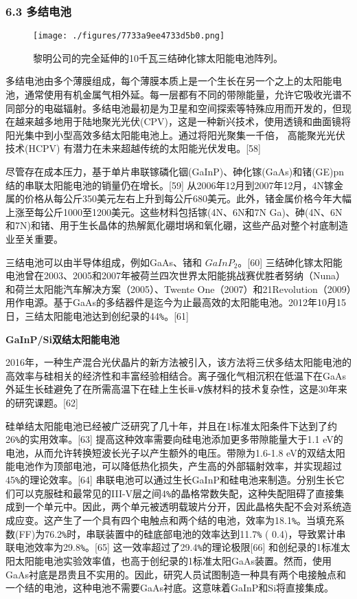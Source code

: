 \subsubsection{6.3 多结电池}

\begin{figure}[ht]
\centering
\texttt{[image: ./figures/7733a9ee4733d5b0.png]}
\caption{黎明公司的完全延伸的10千瓦三结砷化镓太阳能电池阵列。} \label{fig_TYNDC_6}
\end{figure}

多结电池由多个薄膜组成，每个薄膜本质上是一个生长在另一个之上的太阳能电池，通常使用有机金属气相外延。每一层都有不同的带隙能量，允许它吸收光谱不同部分的电磁辐射。多结电池最初是为卫星和空间探索等特殊应用而开发的，但现在越来越多地用于陆地聚光光伏(CPV)，这是一种新兴技术，使用透镜和曲面镜将阳光集中到小型高效多结太阳能电池上。通过将阳光聚集一千倍， 高能聚光光伏技术(HCPV) 有潜力在未来超越传统的太阳能光伏发电。[58]

尽管存在成本压力，基于单片串联镓磷化铟(GaInP)、砷化镓(GaAs)和锗(GE)pn结的串联太阳能电池的销量仍在增长。[59] 从2006年12月到2007年12月，4N镓金属的价格从每公斤350美元左右上升到每公斤680美元。此外，锗金属价格今年大幅上涨至每公斤1000至1200美元。这些材料包括镓(4N、6N和7N Ga)、砷(4N、6N和7N)和锗、用于生长晶体的热解氮化硼坩埚和氧化硼，这些产品对整个衬底制造业至关重要。

三结电池可以由半导体组成，例如GaAs、锗和 $GaInP_2$。[60] 三结砷化镓太阳能电池曾在2003、2005和2007年被荷兰四次世界太阳能挑战赛优胜者努纳（Nuna）和荷兰太阳能汽车解决方案（2005）、Twente One（2007）和21Revolution（2009）用作电源。基于GaAs的多结器件是迄今为止最高效的太阳能电池。2012年10月15日，三结太阳能电池达到创纪录的44\verb|%|。[61]

\textbf{GaInP/Si双结太阳能电池}

2016年，一种生产混合光伏晶片的新方法被引入，该方法将三伏多结太阳能电池的高效率与硅相关的经济性和丰富经验相结合。离子强化气相沉积在低温下在GaAs外延生长硅避免了在所需高温下在硅上生长ⅲ-ⅴ族材料的技术复杂性，这是30年来的研究课题。[62]

硅单结太阳能电池已经被广泛研究了几十年，并且在1标准太阳条件下达到了约26\verb|%|的实用效率。[63] 提高这种效率需要向硅电池添加更多带隙能量大于1.1 eV的电池，从而允许转换短波长光子以产生额外的电压。带隙为1.6-1.8 eV的双结太阳能电池作为顶部电池，可以降低热化损失，产生高的外部辐射效率，并实现超过45\verb|%|的理论效率。[64] 串联电池可以通过生长GaInP和硅电池来制造。分别生长它们可以克服硅和最常见的III-V层之间4\verb|%|的晶格常数失配，这种失配阻碍了直接集成到一个单元中。因此，两个单元被透明载玻片分开，因此晶格失配不会对系统造成应变。这产生了一个具有四个电触点和两个结的电池，效率为18.1\verb|%|。当填充系数(FF)为76.2\verb|%|时，串联装置中的硅底部电池的效率达到11.7\verb|%| ( 0.4)，导致累计串联电池效率为29.8\verb|%|。[65] 这一效率超过了29.4\verb|%|的理论极限[66] 和创纪录的1标准太阳太阳能电池实验效率值，也高于创纪录的1标准太阳GaAs装置。然而，使用GaAs衬底是昂贵且不实用的。因此，研究人员试图制造一种具有两个电接触点和一个结的电池，这种电池不需要GaAs衬底。这意味着GaInP和Si将直接集成。


